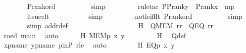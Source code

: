 \begin{isabellebody}
\ \ \ \ \ \ \isamarkupfalse%
\ P{\isacharunderscore}{\kern0pt}rank{\isacharunderscore}{\kern0pt}ord\ \isanewline
\ \ \ \ \ \ \ \isamarkupfalse%
\ simp\ \isanewline
\ \ \ \ \ \ \isamarkupfalse%
\ {\isacharparenleft}{\kern0pt}rule{\isacharunderscore}{\kern0pt}tac\ P{\isacharequal}{\kern0pt}{\isachardoublequoteopen}P{\isacharunderscore}{\kern0pt}rank{\isacharparenleft}{\kern0pt}y{\isacharparenright}{\kern0pt}\ {\isacharless}{\kern0pt}\ P{\isacharunderscore}{\kern0pt}rank{\isacharparenleft}{\kern0pt}x{\isacharparenright}{\kern0pt}{\isachardoublequoteclose}\ \ mp{\isacharparenright}{\kern0pt}\ \isanewline
\ \ \ \ \ \ \isamarkupfalse%
\ lt{\isacharunderscore}{\kern0pt}succ{\isacharunderscore}{\kern0pt}lt\ \isanewline
\ \ \ \ \ \ \ \ \isamarkupfalse%
\ simp\ \isanewline
\ \ \ \ \ \ \isamarkupfalse%
\ not{\isacharunderscore}{\kern0pt}le{\isacharunderscore}{\kern0pt}iff{\isacharunderscore}{\kern0pt}lt\ P{\isacharunderscore}{\kern0pt}rank{\isacharunderscore}{\kern0pt}ord\ \isanewline
\ \ \ \ \ \ \ \isamarkupfalse%
\ simp\ \isanewline
\ \ \ \ \ \ \isamarkupfalse%
\ {\isacharparenleft}{\kern0pt}simp\ add{\isacharcolon}{\kern0pt}r{\isacharunderscore}{\kern0pt}def{\isacharparenright}{\kern0pt}\ \isanewline
\ \ \ \ \ \ \isamarkupfalse%
\ \isanewline
\ \ \ \ \isanewline
\ \ \ \ \isamarkupfalse%
\ H\ {\isacharcolon}{\kern0pt}\ {\isachardoublequoteopen}Q{\isacharparenleft}{\kern0pt}MEM{\isacharcomma}{\kern0pt}\ r{\isacharcomma}{\kern0pt}r{\isacharparenright}{\kern0pt}\ {\isasymand}\ Q{\isacharparenleft}{\kern0pt}EQ{\isacharcomma}{\kern0pt}\ r{\isacharcomma}{\kern0pt}r{\isacharparenright}{\kern0pt}{\isachardoublequoteclose}\ \isanewline
\ \ \ \ \ \ \isamarkupfalse%
\ roed\ main\ \isamarkupfalse%
\ auto\isanewline
\ \ \ \ \isamarkupfalse%
\ H{}{\isacharcolon}{\kern0pt}\ {\isachardoublequoteopen}MEM{\isacharparenleft}{\kern0pt}p{\isacharcomma}{\kern0pt}\ x{\isacharcomma}{\kern0pt}\ y{\isacharparenright}{\kern0pt}{\isachardoublequoteclose}\ \isanewline
\ \ \ \ \ \ \isamarkupfalse%
\ H\ \isamarkupfalse%
\ Q{\isacharunderscore}{\kern0pt}def\ \isamarkupfalse%
\ xpname\ ypname\ pinP\ rle\ \isamarkupfalse%
\ auto\ \isamarkupfalse%
\ \isanewline
\ \ \ \ \isamarkupfalse%
\ H{}{\isacharcolon}{\kern0pt}\ {\isachardoublequoteopen}EQ{\isacharparenleft}{\kern0pt}p{\isacharcomma}{\kern0pt}\ x{\isacharcomma}{\kern0pt}\ y{\isacharparenright}{\kern0pt}{\isachardoublequoteclose}\ \isanewline

\end{isabellebody}
